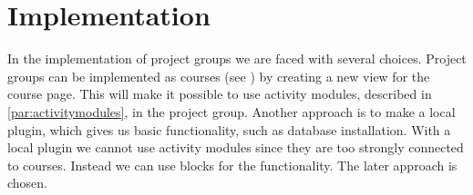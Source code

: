 \chapter{Implementation}
In the implementation of project groups we are faced with several choices. 
Project groups can be implemented as courses (see ) by creating a new view for the course page.  
This will make it possible to use activity modules, described in \ref{par:activitymodules}, in the project group. 
Another approach is to make a local plugin, which gives us basic functionality, such as database installation. 
With a local plugin we cannot use activity modules since they are too strongly connected to courses. 
Instead we can use blocks for the functionality. 
The later approach is chosen. 












